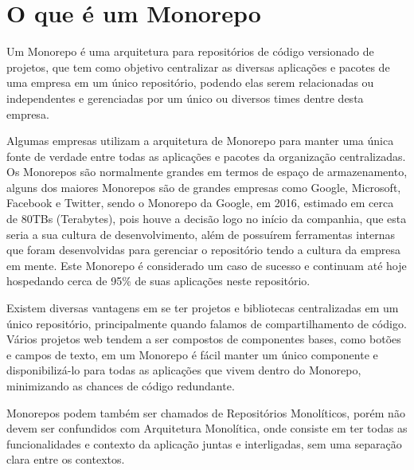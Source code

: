 \section{O que é um Monorepo}

Um Monorepo é uma arquitetura para repositórios de código versionado de projetos, que tem como objetivo centralizar as diversas aplicações e pacotes de uma empresa em um único repositório, podendo elas serem relacionadas ou independentes e gerenciadas por um único ou diversos times dentre desta empresa. 

Algumas empresas utilizam a arquitetura de Monorepo para manter uma única fonte de verdade entre todas as aplicações e pacotes da organização centralizadas. Os Monorepos são normalmente grandes em termos de espaço de armazenamento, alguns dos maiores Monorepos são de grandes empresas como Google, Microsoft, Facebook e Twitter, sendo o Monorepo da Google, em 2016, estimado em cerca de 80TBs (Terabytes), pois houve a decisão logo no início da companhia, que esta seria a sua cultura de desenvolvimento, além de possuírem ferramentas internas que foram desenvolvidas para gerenciar o repositório tendo a cultura da empresa em mente. Este Monorepo é considerado um caso de sucesso e continuam até hoje hospedando cerca de 95\% de suas aplicações neste repositório. 

Existem diversas vantagens em se ter projetos e bibliotecas centralizadas em um único repositório, principalmente quando falamos de compartilhamento de código. Vários projetos web tendem a ser compostos de componentes bases, como botões e campos de texto, em um Monorepo é fácil manter um único componente e disponibilizá-lo para todas as aplicações que vivem dentro do Monorepo, minimizando as chances de código redundante.


Monorepos podem também ser chamados de Repositórios Monolíticos, porém não devem ser confundidos com Arquitetura Monolítica, onde consiste em ter todas as funcionalidades e contexto da aplicação juntas e interligadas, sem uma separação clara entre os contextos.